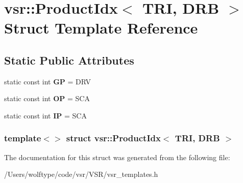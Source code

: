 \hypertarget{structvsr_1_1_product_idx_3_01_t_r_i_00_01_d_r_b_01_4}{\section{vsr\-:\-:Product\-Idx$<$ T\-R\-I, D\-R\-B $>$ Struct Template Reference}
\label{structvsr_1_1_product_idx_3_01_t_r_i_00_01_d_r_b_01_4}
}
\subsection*{Static Public Attributes}
\begin{DoxyCompactItemize}
\item 
\hypertarget{structvsr_1_1_product_idx_3_01_t_r_i_00_01_d_r_b_01_4_a0c2a5cc35cc0f72162ddfe3c46e47844}{static const int {\bfseries G\-P} = D\-R\-V}\label{structvsr_1_1_product_idx_3_01_t_r_i_00_01_d_r_b_01_4_a0c2a5cc35cc0f72162ddfe3c46e47844}

\item 
\hypertarget{structvsr_1_1_product_idx_3_01_t_r_i_00_01_d_r_b_01_4_a81fbc76aa385002c654ef25ba98de897}{static const int {\bfseries O\-P} = S\-C\-A}\label{structvsr_1_1_product_idx_3_01_t_r_i_00_01_d_r_b_01_4_a81fbc76aa385002c654ef25ba98de897}

\item 
\hypertarget{structvsr_1_1_product_idx_3_01_t_r_i_00_01_d_r_b_01_4_a5bd0502f63342e148361112490625b1b}{static const int {\bfseries I\-P} = S\-C\-A}\label{structvsr_1_1_product_idx_3_01_t_r_i_00_01_d_r_b_01_4_a5bd0502f63342e148361112490625b1b}

\end{DoxyCompactItemize}
\subsubsection*{template$<$$>$ struct vsr\-::\-Product\-Idx$<$ T\-R\-I, D\-R\-B $>$}



The documentation for this struct was generated from the following file\-:\begin{DoxyCompactItemize}
\item 
/\-Users/wolftype/code/vsr/\-V\-S\-R/vsr\-\_\-templates.\-h\end{DoxyCompactItemize}
